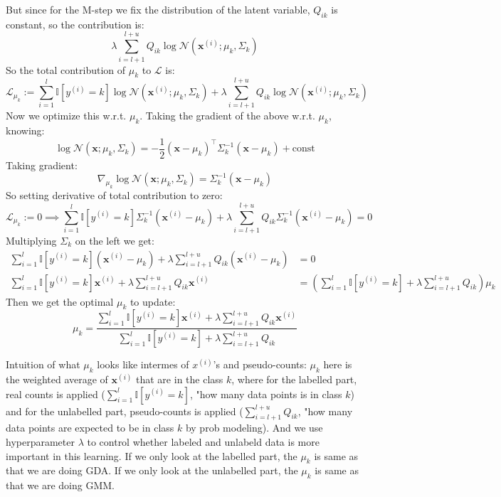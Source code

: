 \documentclass[lang=cn,11pt]{elegantbook}
\begin{document}
But since for the M-step we fix the distribution of the latent variable, $Q_{ik}$ is constant, so the contribution is: \[
\lambda \sum_{i=l+1}^{l+u} Q_{i k}  \log  {\mathcal{N}\left(\mathbf{x}^{(i)} ; {\mu}_k, {\Sigma}_k\right)}
\]
So the total contribution of ${\mu}_k$ to $\mathcal{L}$ is: $$
\mathcal{L}_{{\mu}_k} :=  \sum_{i=1}^l \mathbb{I}\left[y^{(i)}=k\right] \log \mathcal{N}\left(\mathbf{x}^{(i)} ; {\mu}_k, {\Sigma}_k\right)+\lambda \sum_{i=l+1}^{l+u} Q_{i k} \log \mathcal{N}\left(\mathbf{x}^{(i)} ; {\mu}_k, {\Sigma}_k\right)
$$
Now we optimize this w.r.t. ${\mu}_k$. Taking the gradient of the above w.r.t. ${\mu}_k$, knowing:
$$
\log \mathcal{N}\left(\mathbf{x} ; {\mu}_k, {\Sigma}_k\right)=-\frac{1}{2}\left(\mathbf{x}-{\mu}_k\right)^{\top} {\Sigma}_k^{-1}\left(\mathbf{x}-{\mu}_k\right)+\mathrm{const}
$$
Taking gradient: $$
\nabla_{{\mu}_k} \log \mathcal{N}\left(\mathbf{x} ; {\mu}_k, {\Sigma}_k\right)={\Sigma}_k^{-1}\left(\mathbf{x}-{\mu}_k\right)
$$
So setting derivative of total contribution to zero:
$$
\mathcal{L}_{{\mu}_k} := 0 \implies\sum_{i=1}^l \mathbb{I}\left[y^{(i)}=k\right] {\Sigma}_k^{-1}\left(\mathbf{x}^{(i)}-{\mu}_k\right)+\lambda \sum_{i=l+1}^{l+u} Q_{i k} {\Sigma}_k^{-1}\left(\mathbf{x}^{(i)}-{\mu}_k\right)=0
$$
Multiplying ${\Sigma}_k$ on the left we get: 
\begin{align*}
    \sum_{i=1}^l \mathbb{I}\left[y^{(i)} =k\right]\left(\mathbf{x}^{(i)}-{\mu}_k\right)+\lambda \sum_{i=l+1}^{l+u} Q_{i k}\left(\mathbf{x}^{(i)}-{\mu}_k\right) & =0 \\
\sum_{i=1}^l \mathbb{I}\left[y^{(i)}=k\right] \mathbf{x}^{(i)}+\lambda \sum_{i=l+1}^{l+u} Q_{i k} \mathbf{x}^{(i)} &=\left(\sum_{i=1}^l \mathbb{I}\left[y^{(i)}=k\right]+\lambda \sum_{i=l+1}^{l+u} Q_{i k}\right) {\mu}_k 
\end{align*}
Then we get the optimal ${\mu}_k $ to update:
$$
{\mu}_k =\frac{\sum_{i=1}^l \mathbb{I}\left[y^{(i)}=k\right] \mathbf{x}^{(i)}+\lambda \sum_{i=l+1}^{l+u} Q_{i k} \mathbf{x}^{(i)}}{\sum_{i=1}^l \mathbb{I}\left[y^{(i)}=k\right]+\lambda \sum_{i=l+1}^{l+u} Q_{i k}}$$

Intuition of what $\mu_k$ looks like intermes of $x^{(i)}$'s and pseudo-counts: $\mu_k$ here is the weighted average of  $\mathbf{x}^{(i)}$ that are in the class $k$, where for the labelled part, real counts is applied ($\sum_{i=1}^l \mathbb{I}\left[y^{(i)}=k\right]$, "how many data points is in class $k$) and for the unlabelled part, pseudo-counts is applied ($\sum_{i=l+1}^{l+u} Q_{i k}$, "how many data points are expected to be in class $k$ by prob modeling).
And we use hyperparameter $\lambda $ to control whether labeled and unlabeld data is more important in this learning.
If we only look at the labelled part, the $\mu_k$ is same as that we are doing GDA. If we only look at the unlabelled part, the $\mu_k$ is same as that we are doing GMM. 
\end{document}

